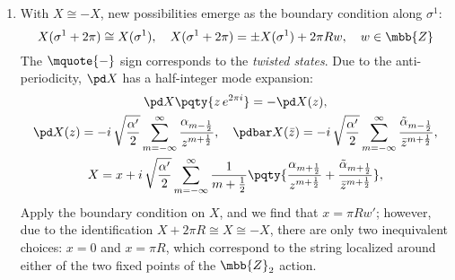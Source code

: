 \documentclass[a4paper,10pt]{article}
\begin{document}
\begin{enumerate}
\begin{enumerate}
	\item With $X\cong -X$, new possibilities emerge as the boundary condition along $\sigma^1$:
	\begin{equation}
		X(\sigma^1 + 2\pi) \cong X(\sigma^1),\quad
		X(\sigma^1 + 2\pi) = \pm X(\sigma^1) + 2\pi Rw,\quad
		w\in\mbb{Z}
	\end{equation}
	The $\mquote{-}$ sign corresponds to the \textit{twisted states}. Due to the anti-periodicity, $\pd X$ has a half-integer mode expansion:
	\begin{gather}
		\allowdisplaybreaks
		\pd X\pqty{z\,e^{2\pi i}} = - \pd X(z),\\
		\pd X(z) =
			-i\,\sqrt{\frac{\alpha'}{2}}
			\sum_{m = -\infty}^\infty
				\frac{\alpha_{m-\frac{1}{2}}}
					{z^{m+\frac{1}{2}}},\quad
		\pdbar X(\bar{z}) =
			-i\,\sqrt{\frac{\alpha'}{2}}
			\sum_{m = -\infty}^\infty
				\frac{\tilde{\alpha}_{m-\frac{1}{2}}}
					{\bar{z}^{m+\frac{1}{2}}},\\
		X = x + i\,\sqrt{\frac{\alpha'}{2}}
			\sum_{m = -\infty}^\infty
				\frac{1}{m+\frac{1}{2}}
				\pqty{
					\frac{\alpha_{m+\frac{1}{2}}}
						{z^{m+\frac{1}{2}}}
					+ \frac{\tilde{\alpha}_{m+\frac{1}{2}}}
						{\bar{z}^{m+\frac{1}{2}}}
				},
	\end{gather}
	Apply the boundary condition on $X$, and we find that $x = \pi R w'$; however, due to the identification $X + 2\pi R \cong X \cong -X$, there are only two inequivalent choices: $x = 0$ and $x =\pi R$, which correspond to the string localized around either of the two fixed points of the $\mbb{Z}_2$ action. 
	

\end{enumerate}
\end{enumerate}
\end{document}
